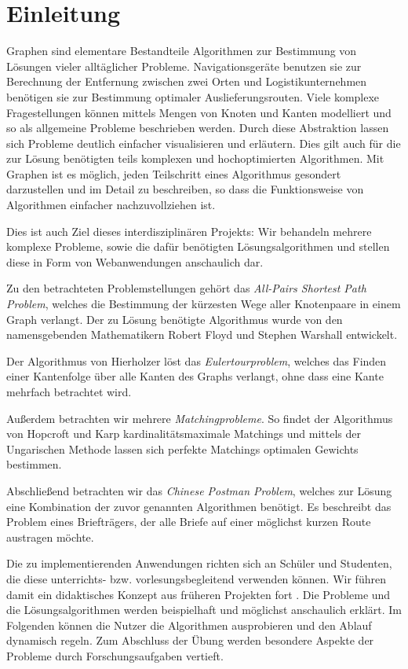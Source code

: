 \chapter{Einleitung} %
Graphen sind elementare Bestandteile Algorithmen zur Bestimmung von Lösungen vieler alltäglicher Probleme. Navigationsgeräte benutzen sie zur Berechnung der Entfernung zwischen zwei Orten und Logistikunternehmen benötigen sie zur Bestimmung optimaler Auslieferungsrouten. Viele komplexe Fragestellungen können mittels Mengen von Knoten und Kanten modelliert und so als allgemeine Probleme beschrieben werden. Durch diese Abstraktion lassen sich Probleme deutlich einfacher visualisieren und erläutern. Dies gilt auch für die zur Lösung benötigten teils komplexen und hochoptimierten Algorithmen. Mit Graphen ist es möglich, jeden Teilschritt eines Algorithmus gesondert darzustellen und im Detail zu beschreiben, so dass die Funktionsweise von Algorithmen einfacher nachzuvollziehen ist.

Dies ist auch Ziel dieses interdisziplinären Projekts: Wir behandeln mehrere komplexe Probleme, sowie die dafür benötigten Lösungsalgorithmen und stellen diese in Form von Webanwendungen anschaulich dar.

Zu den betrachteten Problemstellungen gehört das \textit{All-Pairs Shortest Path Problem}, welches die Bestimmung der kürzesten Wege aller Knotenpaare in einem Graph verlangt. Der zu Lösung benötigte Algorithmus wurde von den namensgebenden Mathematikern Robert Floyd und Stephen Warshall entwickelt.

Der Algorithmus von Hierholzer löst das \textit{Eulertourproblem}, welches das Finden einer Kantenfolge über alle Kanten des Graphs verlangt, ohne dass eine Kante mehrfach betrachtet wird.

Außerdem betrachten wir mehrere \textit{Matchingprobleme}. So findet der Algorithmus von Hopcroft und Karp kardinalitätsmaximale Matchings und mittels der Ungarischen Methode lassen sich perfekte Matchings optimalen Gewichts bestimmen. 

Abschließend betrachten wir das \textit{Chinese Postman Problem}, welches zur Lösung eine Kombination der zuvor genannten Algorithmen benötigt. Es beschreibt das Problem eines Briefträgers, der alle Briefe auf einer möglichst kurzen Route austragen möchte.

Die zu implementierenden Anwendungen richten sich an Schüler und Studenten, die diese unterrichts- bzw. vorlesungsbegleitend verwenden können. Wir führen damit ein didaktisches Konzept aus früheren Projekten fort \parencite{Stotz2013, Velden2014}. Die Probleme und die Lösungsalgorithmen werden beispielhaft und möglichst anschaulich erklärt. Im Folgenden können die Nutzer die Algorithmen ausprobieren und den Ablauf dynamisch regeln. Zum Abschluss der Übung werden besondere Aspekte der Probleme durch Forschungsaufgaben vertieft.


